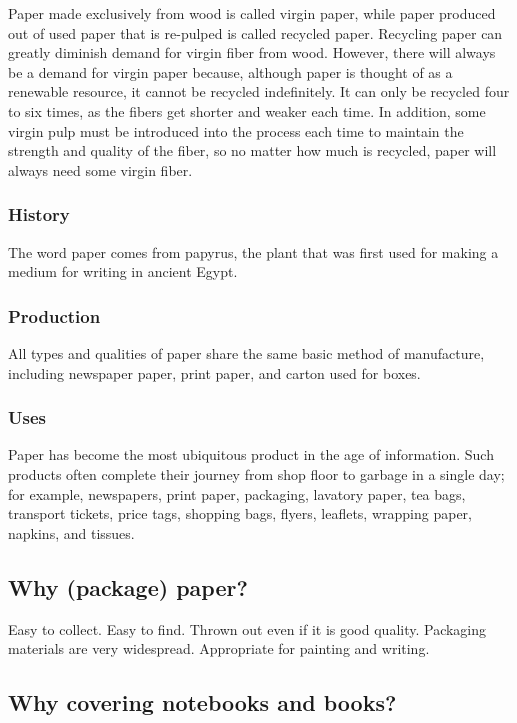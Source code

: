 \documentclass[12pt]{article}
\begin{document}
Paper made exclusively from wood is called virgin paper, while paper produced out of used paper that is re-pulped is called recycled paper. Recycling paper can greatly diminish demand for virgin fiber from wood. However, there will always be a demand for virgin paper because, although paper is thought of as a renewable resource, it cannot be recycled indefinitely. It can only be recycled four to six times, as the fibers get shorter and weaker each time. In addition, some virgin pulp must be introduced into the process each time to maintain the strength and quality of the fiber, so no matter how much is recycled, paper will always need some virgin fiber.

%
\subsubsection{History}
The word paper comes from papyrus, the plant that was first used for making a medium for writing in ancient Egypt.

%
\subsubsection{Production}
All types and qualities of paper share the same basic method of manufacture, including newspaper paper, print paper, and carton used for boxes.

%
\subsubsection{Uses}
Paper has become the most ubiquitous product in the age of information. Such products often complete their journey from shop floor to garbage in a single day; for example, newspapers, print paper, packaging, lavatory paper, tea bags, transport tickets, price tags, shopping bags, flyers, leaflets, wrapping paper, napkins, and tissues. 

\subsection{Why (package) paper?}
Easy to collect. Easy to find. Thrown out even if it is good quality. Packaging materials are very widespread. Appropriate for painting and writing.

\subsection{Why covering notebooks and books?}
\end{document}
